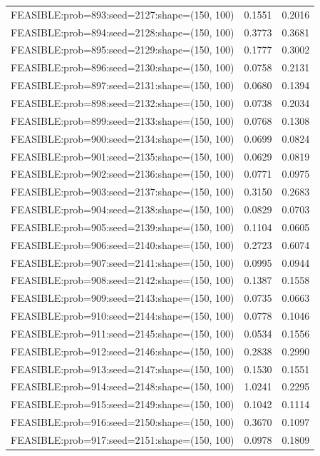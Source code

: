 \begin{longtable}{lcc}
FEASIBLE:prob=893:seed=2127:shape=(150, 100) &   0.1551 & 0.2016 \\
FEASIBLE:prob=894:seed=2128:shape=(150, 100) &   0.3773 & 0.3681 \\
FEASIBLE:prob=895:seed=2129:shape=(150, 100) &   0.1777 & 0.3002 \\
FEASIBLE:prob=896:seed=2130:shape=(150, 100) &   0.0758 & 0.2131 \\
FEASIBLE:prob=897:seed=2131:shape=(150, 100) &   0.0680 & 0.1394 \\
FEASIBLE:prob=898:seed=2132:shape=(150, 100) &   0.0738 & 0.2034 \\
FEASIBLE:prob=899:seed=2133:shape=(150, 100) &   0.0768 & 0.1308 \\
FEASIBLE:prob=900:seed=2134:shape=(150, 100) &   0.0699 & 0.0824 \\
FEASIBLE:prob=901:seed=2135:shape=(150, 100) &   0.0629 & 0.0819 \\
FEASIBLE:prob=902:seed=2136:shape=(150, 100) &   0.0771 & 0.0975 \\
FEASIBLE:prob=903:seed=2137:shape=(150, 100) &   0.3150 & 0.2683 \\
FEASIBLE:prob=904:seed=2138:shape=(150, 100) &   0.0829 & 0.0703 \\
FEASIBLE:prob=905:seed=2139:shape=(150, 100) &   0.1104 & 0.0605 \\
FEASIBLE:prob=906:seed=2140:shape=(150, 100) &   0.2723 & 0.6074 \\
FEASIBLE:prob=907:seed=2141:shape=(150, 100) &   0.0995 & 0.0944 \\
FEASIBLE:prob=908:seed=2142:shape=(150, 100) &   0.1387 & 0.1558 \\
FEASIBLE:prob=909:seed=2143:shape=(150, 100) &   0.0735 & 0.0663 \\
FEASIBLE:prob=910:seed=2144:shape=(150, 100) &   0.0778 & 0.1046 \\
FEASIBLE:prob=911:seed=2145:shape=(150, 100) &   0.0534 & 0.1556 \\
FEASIBLE:prob=912:seed=2146:shape=(150, 100) &   0.2838 & 0.2990 \\
FEASIBLE:prob=913:seed=2147:shape=(150, 100) &   0.1530 & 0.1551 \\
FEASIBLE:prob=914:seed=2148:shape=(150, 100) &   1.0241 & 0.2295 \\
FEASIBLE:prob=915:seed=2149:shape=(150, 100) &   0.1042 & 0.1114 \\
FEASIBLE:prob=916:seed=2150:shape=(150, 100) &   0.3670 & 0.1097 \\
FEASIBLE:prob=917:seed=2151:shape=(150, 100) &   0.0978 & 0.1809 \\

\end{longtable}
